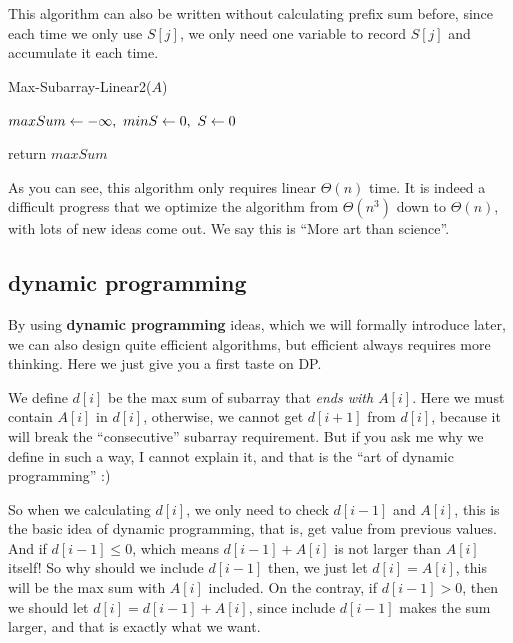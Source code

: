 \documentclass[11pt, a4paper]{COMP3711}
\begin{document}
\begin{spacing}{1.5}
    This algorithm can also be written without calculating prefix sum 
    before, since each time we only use $S[j]$, we only need one
    variable to record $S[j]$ and accumulate it each time.

    \begin{algorithm}
        \caption{Max-Subarray-Linear2($A$)}
        $maxSum \leftarrow -\infty,\ minS\leftarrow 0,\ S\leftarrow 0$

        return $maxSum$
    \end{algorithm}

    As you can see, this algorithm only requires linear $\Theta(n)$ time.
    It is indeed a difficult progress that we optimize the algorithm 
    from $\Theta(n^3)$ down to $\Theta(n)$, with lots of new ideas 
    come out. We say this is ``More art than science''.

    \subsection{dynamic programming}

    By using {\bf dynamic programming} ideas, which we will formally 
    introduce later, we can also design quite efficient algorithms,
    but efficient always requires more thinking.
    Here we just give you a first taste on DP.

    We define $d[i]$ be the max sum of subarray that {\it 
    ends with $A[i]$}. Here we must contain $A[i]$ in 
    $d[i]$, otherwise, we cannot get $d[i+1]$ from $d[i]$,
    because it will break the ``consecutive'' subarray requirement.
    But if you ask me why we define in such a way, I cannot 
    explain it, and that is the ``art of dynamic programming'' :)

    So when we calculating $d[i]$, we only need to check $d[i-1]$
    and $A[i]$, this is the basic idea of dynamic programming, 
    that is, get value from previous values.
    And if $d[i-1]\le 0$, which means $d[i-1]+A[i]$ is not larger than 
    $A[i]$ itself! So why should we include $d[i-1]$ then, 
    we just let $d[i]=A[i]$, this will be the max sum with 
    $A[i]$ included.
    On the contray, if $d[i-1]>0$, then we should let 
    $d[i]=d[i-1]+A[i]$, since include $d[i-1]$ makes the sum 
    larger, and that is exactly what we want.


\end{spacing}
\end{document}
